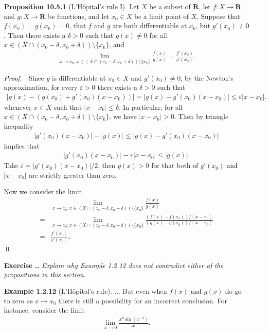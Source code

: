 \documentclass{book}
\newcommand{\pff}{\vspace{.25em}\noindent\emph{Proof.}~~}
\newcommand{\titl}[1]{\noindent\textbf{#1}}
\newcounter{Exercise}[section]
\renewcommand{\theExercise}{\thesection.\arabic{Exercise}.}
\newcommand{\new}{\vspace{1.5em}\noindent\textbf{{Exercise \stepcounter{Exercise}\textbf{\theExercise}}} }
\begin{document}
\begin{framed}
\titl{Proposition 10.5.1} (L'H\^opital's rule I). Let $X$ be a subset of $\mathbf{R}$, let $f:X\to\mathbf{R}$ and $g:X\to\mathbf{R}$ be functions, and let $x_0\in X$ be a limit point of $X$. Suppose that $f(x_0)=g(x_0)=0$, that $f$ and $g$ are both differentiable at $x_0$, but $g'(x_0)\neq 0$. Then there exists a $\delta>0$ such that $g(x)\neq 0$ for all $x\in(X\cap(x_0-\delta,x_0+\delta))\setminus\{x_0\}$, and
    \begin{align*}
        \lim_{x\to x_0;x\in(X\cap(x_0-\delta,x_0+\delta))\setminus\{x_0\}}\frac{f(x)}{g(x)}=\frac{f'(x_0)}{g'(x_0)}.
    \end{align*}
\end{framed}

\pff Since $g$ is differentiable at $x_0\in X$ and $g'(x_0)\neq 0$, by the Newton's approximation, for every $\varepsilon>0$ there exists a $\delta>0$ such that
    \begin{align*}
        |g(x)-(g(x_0)+g'(x_0)(x-x_0))|=|g(x)-g'(x_0)(x-x_0)|\leq\varepsilon|x-x_0|.
    \end{align*}
whenever $x\in X$ such that $|x-x_0|\leq\delta$. In particular, for all $x\in(X\cap(x_0-\delta,x_0+\delta))\setminus\{x_0\}$, we have $|x-x_0|>0$. Then by triangle inequality
    \begin{align*}
        |g'(x_0)(x-x_0)|-|g(x)|\leq|g(x)-g'(x_0)(x-x_0)|
    \end{align*}
implies that
    \begin{align*}
        |g'(x_0)(x-x_0)|-\varepsilon|x-x_0|\leq|g(x)|.
    \end{align*}
Take $\varepsilon=|g'(x_0)(x-x_0)|/2$, then $g(x)>0$ for that both of $g'(x_0)$ and $|x-x_0|$ are strictly greater than zero.

Now we consider the limit
    \begin{align*}
        &\lim_{x\to x_0;x\in(X\cap(x_0-\delta,x_0+\delta))\setminus\{x_0\}}\frac{f(x)}{g(x)}\\
        =&\lim_{x\to x_0;x\in(X\cap(x_0-\delta,x_0+\delta))\setminus\{x_0\}}\frac{(f(x)-f(x_0))/(x-x_0)}{(g(x)-g(x_0))/(x-x_0)}\\
        =&\frac{f'(x_0)}{g'(x_0)}.
    \end{align*}\qed

\new\emph{Explain why Example 1.2.12 does not contradict either of the propositions in this section.}

\begin{framed}
\titl{Example 1.2.12} (L'H\^opital's rule). ... But even when $f(x)$ and $g(x)$ do go to zero as $x\to x_0$ there is still a possibility for an incorrect conclusion. For instance. consider the limit
    \begin{align*}
        \lim_{x\to 0}\frac{x^2\sin(x^{-4})}{x}.
    \end{align*}
\end{framed}
\end{document}
